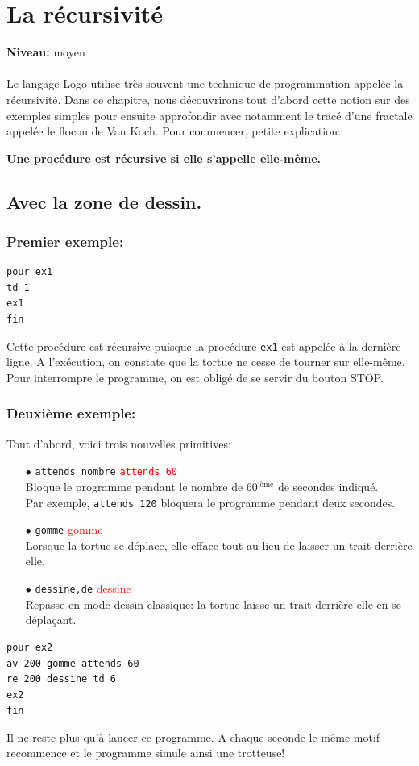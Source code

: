 \chapter{La récursivité}
{ }\hfill\textbf{Niveau:} moyen\\ \\
\noindent Le langage Logo utilise très souvent une technique de programmation appelée la récursivité. Dans ce chapitre, nous découvrirons tout d'abord cette notion sur des exemples simples pour ensuite approfondir avec notamment le tracé d'une fractale appelée  le flocon de Van Koch. Pour commencer, petite explication:
\begin{center}
\textbf{Une procédure est récursive si elle s'appelle elle-même.}                                                                 \end{center}
\section{Avec la zone de dessin.}
\subsection{ Premier exemple:}
\begin{verbatim}
pour ex1
td 1
ex1
fin  
\end{verbatim}
Cette procédure est récursive puisque la procédure \texttt{ex1} est appelée à la dernière ligne. A l'exécution, on constate que la tortue ne cesse de tourner sur elle-même. Pour interrompre le programme, on est obligé de se servir du bouton STOP.
\subsection{Deuxième exemple:}
\noindent Tout d'abord, voici trois nouvelles primitives:
\begin{itemize}
\item [$\bullet$] \texttt{attends nombre}\hspace {4cm } \textcolor{red}{ \texttt{attends 60}}\\
Bloque le programme pendant le nombre de 60$^{\textrm{ième}}$ de secondes indiqué. \\
Par exemple, \texttt{attends 120} bloquera le programme pendant deux secondes.
\item [$\bullet$] \texttt{gomme}\hspace {4cm } \textcolor{red}{{gomme}}\\
Lorsque la tortue se déplace, elle efface tout au lieu de laisser un trait derrière elle.
\item [$\bullet$] \texttt{dessine,de}\hspace {4cm } \textcolor{red}{{dessine}}\\
Repasse en mode dessin classique: la tortue laisse un trait derrière elle en se déplaçant.
\end{itemize}
\noindent
\begin{verbatim}
pour ex2
av 200 gomme attends 60
re 200 dessine td 6
ex2
fin
\end{verbatim}
Il ne reste plus qu'à lancer ce programme. A chaque seconde le même motif recommence et le programme simule ainsi une trotteuse!
